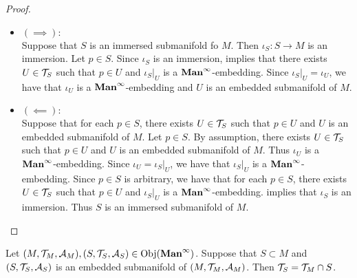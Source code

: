 \documentclass{book}
\begin{document}
	\begin{proof}\
		\begin{itemize}
			\item $(\implies):$ \\
			Suppose that $S$ is an immersed submanifold fo $M$. Then $\iota_S:S \rightarrow M$ is an immersion. Let $p \in S$. Since $\iota_S$ is an immersion,  implies that there exists $U \in \mathcal{T}_S$ such that $p \in U$ and $\iota_S|_U$ is a $\operatorname*{\text{\textbf{Man}}^{\infty}}$-embedding. Since $\iota_S|_U = \iota_U$, we have that $\iota_U$ is a $\operatorname*{\text{\textbf{Man}}^{\infty}}$-embedding and $U$ is an embedded submanifold of $M$.
			\item $(\impliedby):$ \\
			Suppose that for each $p \in S$, there exists $U \in \mathcal{T}_S$ such that $p \in U$ and $U$ is an embedded submanifold of $M$. Let $p \in S$. By assumption, there exists  $U \in \mathcal{T}_S$ such that $p \in U$ and $U$ is an embedded submanifold of $M$. Thus $\iota_U$ is a $\operatorname*{\text{\textbf{Man}}^{\infty}}$-embedding. Since $\iota_U = \iota_S|_U$, we have that $\iota_S|_U$ is a $\operatorname*{\text{\textbf{Man}}^{\infty}}$-embedding. Since $p \in S$ is arbitrary, we have that for each $p \in S$, there exists $U \in \mathcal{T}_S$ such that $p \in U$ and $\iota_S|_U$ is a $\operatorname*{\text{\textbf{Man}}^{\infty}}$-embedding.  implies that $\iota_S$ is an immersion. Thus $S$ is an immersed submanifold of $M$.
		\end{itemize}
	\end{proof}

	\begin{ex}  
		Let $(M, \mathcal{T}_M, \mathcal{A}_M), (S, \mathcal{T}_S, \mathcal{A}_S) \in \operatorname{Obj}(\operatorname*{\text{\textbf{Man}}^{\infty}})$. Suppose that $S \subset M$ and $(S, \mathcal{T}_S, \mathcal{A}_S)$ is an embedded submanifold of $(M, \mathcal{T}_M, \mathcal{A}_M)$. Then $\mathcal{T}_S = \mathcal{T}_M \cap S$. 
	\end{ex}
	
\end{document}
